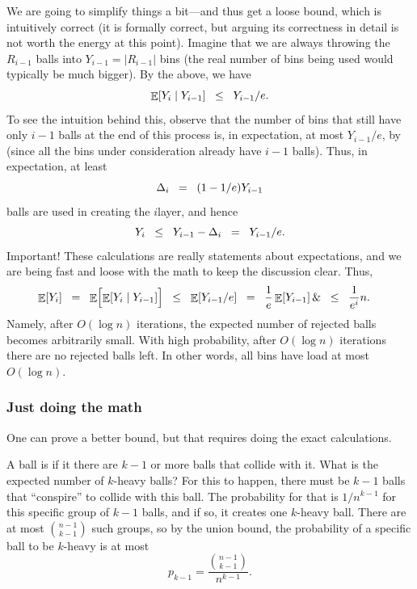 We are going to simplify things a bit---and thus get a loose bound, which
is intuitively correct (it is formally correct, but arguing its
correctness in detail is not worth the energy at this point).
Imagine that we are always throwing the $R_{i-1}$ balls into
$Y_{i-1}=|R_{i-1}|$ bins (the real number of bins being used would
typically be much bigger). By the above, we have
\begin{equation*}
\mathop{\mathbb{E}}\!\left[ Y_i \;\middle\vert\; Y_{i-1} \right]
\mathrel{\;\;\leq\;\;}
Y_{i-1}/e.
\end{equation*}
To see the intuition behind this, observe that the number of bins that
still have only $i-1$ balls at the end of this process is, in expectation,
at most $Y_{i-1}/e$, by  (since all the bins under
consideration already have $i-1$ balls). Thus, in expectation, at least
\begin{equation*}
    \Delta_i \mathrel{\;\;=\;\;} (1-1/e)Y_{i-1}    
\end{equation*}
balls are used in creating the $i$\th layer, and hence
\begin{equation*}
    Y_i
    \mathrel{\;\;\leq\;\;}
    Y_{i-1}-\Delta_i
    \mathrel{\;\;=\;\;}
    Y_{i-1}/e.    
\end{equation*}
Important! These calculations are really statements about expectations,
and we are being fast and loose with the math to keep the discussion
clear.  Thus,
\begin{align*}
    \Ex{Y_i}%
    &\EQ%
    \Ex{\Bigl.\ExCond{Y_i}{Y_{i-1}}}
    \LEQ
    \Ex{Y_{i-1}/e}
    \EQ
    \frac{1}{e}\Ex{Y_{i-1}}
    \&
    \LEQ
    \frac{1}{e^i}n.
\end{align*}
Namely, after $O(\log n)$ iterations, the expected number of rejected
balls becomes arbitrarily small. With high probability, after $O(\log n)$
iterations there are no rejected balls left. In other words, all bins
have load at most $O(\log n)$.


\subsubsection{Just doing the math}

One can prove a better bound, but that requires doing the exact calculations.

\begin{example}
    A ball is  if it there are $k-1$ or more balls that
    collide with it.  What is the expected number of $k$-heavy balls? For
    this to happen, there must be $k-1$ balls that ``conspire'' to
    collide with this ball.  The probability for that is $1/n^{k-1}$ for
    this specific group of $k-1$ balls, and if so, it creates one
    $k$-heavy ball. There are at most $\binom{n-1}{k-1}$ such groups, so
    by the union bound, the probability of a specific ball to be
    $k$-heavy is at most
    \begin{equation*}
        p_{k-1} = \frac{\binom{n-1}{k-1}}{n^{k-1}}.
    \end{equation*}
\end{example}

